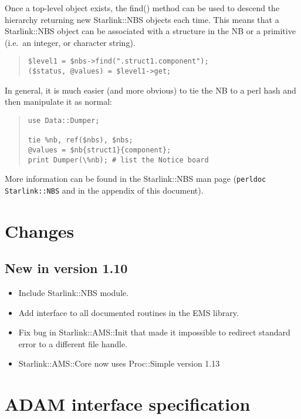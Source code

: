 \documentclass[twoside,11pt]{article}
\newenvironment{myquote}{\begin{quote}\begin{small}}{\end{small}\end{quote}}
\renewcommand{\_}{\texttt{\symbol{95}}}
\begin{document}
Once a top-level object exists, the find() method can be used to 
descend the hierarchy returning new Starlink::NBS objects each time.
This means that a Starlink::NBS object can be associated with a structure
in the NB or a primitive (i.e.\ an integer, or character string).

\begin{myquote}
\begin{verbatim}
$level1 = $nbs->find(".struct1.component");
($status, @values) = $level1->get;
\end{verbatim}
\end{myquote}

In general, it is much easier (and more obvious) to tie the NB
to a perl hash and then manipulate it as normal:

\begin{myquote}
\begin{verbatim}
use Data::Dumper;

tie %nb, ref($nbs), $nbs;
@values = $nb{struct1}{component};
print Dumper(\%nb); # list the Notice board
\end{verbatim}
\end{myquote}

More information can be found in the Starlink::NBS man page
(\texttt{perldoc Starlink::NBS} and in the appendix of this document).

\appendix

\section{Changes}

\subsection{New in version 1.10}

\begin{itemize}
\item Include Starlink::NBS module.
\item Add interface to all documented routines in the EMS library.
\item Fix bug in Starlink::AMS::Init that made it impossible to redirect
standard error to a different file handle.
\item Starlink::AMS::Core now uses Proc::Simple version 1.13
\end{itemize}


\section{ADAM interface specification}
\end{document}
